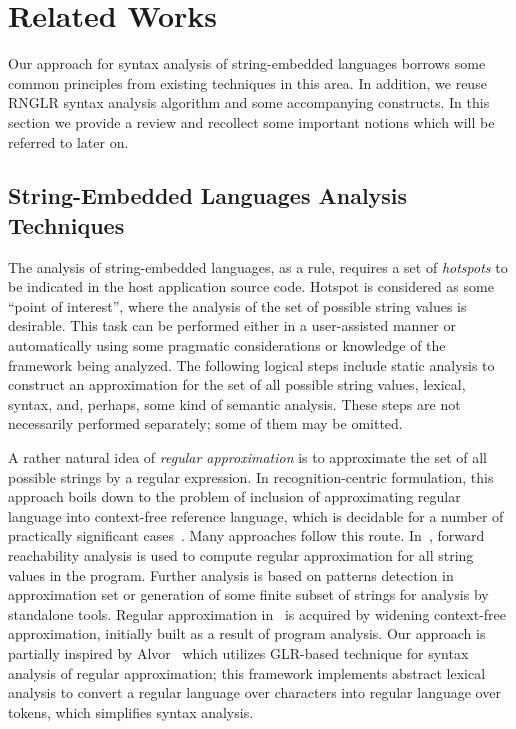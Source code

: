\section{Related Works}

Our approach for syntax analysis of string-embedded languages borrows some common principles
from existing techniques in this area. In addition, we reuse RNGLR syntax analysis algorithm 
and some accompanying constructs. In this section we provide a review and recollect some important
notions which will be referred to later on. 

\subsection{String-Embedded Languages Analysis Techniques}
The analysis of string-embedded languages, as a rule, requires a set of \emph{hotspots} to
be indicated in the host application source code. Hotspot is considered as some ``point 
of interest'', where the analysis of the set of possible string values is desirable. This task can be
performed either in a user-assisted manner or automatically using some pragmatic 
considerations or knowledge of the framework being analyzed. The following logical steps 
include static analysis to construct an approximation for the set of all possible string values,
lexical, syntax, and, perhaps, some kind of semantic analysis. These steps are not
necessarily performed separately; some of them may be omitted.

A rather natural idea of \emph{regular approximation} is to approximate the set of all possible 
strings by a regular expression. In recognition-centric formulation, this approach boils down to
the problem of inclusion of approximating regular language into context-free reference language, which
is decidable for a number of practically significant cases~\cite{LangInclusion}.
Many approaches follow this route. In~\cite{Stranger}, forward reachability analysis is used to compute regular 
approximation for all string values in the program. Further analysis is based on patterns detection in approximation 
set or generation of some finite subset of strings for analysis by standalone tools. Regular approximation in~\cite{JSA} 
is acquired by widening context-free approximation, initially built as a result of program analysis. 
Our approach is partially inspired by Alvor~\cite{Alvor,ALVOR2} which utilizes GLR-based technique for syntax 
analysis of regular approximation; this framework implements abstract lexical analysis to convert a
regular language over characters into regular language over tokens, which simplifies syntax analysis.

